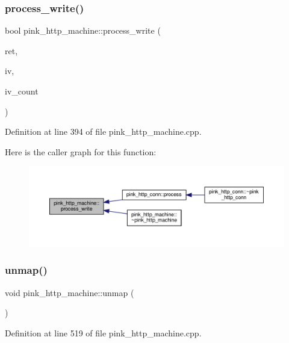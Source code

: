 \subsubsection{\texorpdfstring{process\+\_\+write()}{process\_write()}}
{\footnotesize\ttfamily bool pink\+\_\+http\+\_\+machine\+::process\+\_\+write (\begin{DoxyParamCaption}\item[{\hyperlink{classpink__http__machine_afb1e590cd61676c2f8859c4e01e5b150}{H\+T\+T\+P\+\_\+\+C\+O\+DE}}]{ret,  }\item[{struct iovec $\ast$}]{iv,  }\item[{int \&}]{iv\+\_\+count }\end{DoxyParamCaption})}



Definition at line 394 of file pink\+\_\+http\+\_\+machine.\+cpp.

Here is the caller graph for this function\+:\nopagebreak
\begin{figure}[H]
\begin{center}
\leavevmode
\includegraphics[width=350pt]{classpink__http__machine_a7144e4279cd09ab8ce56873bd3906f24_icgraph}
\end{center}
\end{figure}
\mbox{\label{classpink__http__machine_a26debab8c361df5c79966f11e2b2dd17}} 
\subsubsection{\texorpdfstring{unmap()}{unmap()}}
{\footnotesize\ttfamily void pink\+\_\+http\+\_\+machine\+::unmap (\begin{DoxyParamCaption}{ }\end{DoxyParamCaption})}



Definition at line 519 of file pink\+\_\+http\+\_\+machine.\+cpp.

